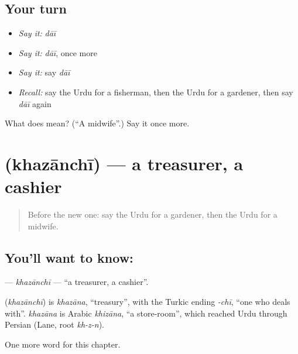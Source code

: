 \subsection*{Your turn}
\begin{itemize}
\raggedright
  \item \emph{Say it:} \emph{dāī}
  \item \emph{Say it:} \emph{dāī}, once more
  \item \emph{Say it:} say \emph{dāī}
  \item \emph{Recall:} say the Urdu for a fisherman, then the Urdu for a gardener, then say \emph{dāī} again
\end{itemize}

\begin{tcolorbox}[breakable,colback=teal!4,colframe=teal!35!black,title={Before you move on}]
What does  mean? (\textquotedblleft{}A midwife\textquotedblright{}.) Say it once more.
\end{tcolorbox}
\section[\texorpdfstring{\ur{خزانچی} (khazānchī)}{خزانچی (khazānchī)}]{ (khazānchī) — a treasurer, a cashier}

\label{lesson:UR-C179-khazanchi}



\begin{quote}
Before the new one: say the Urdu for a gardener, then the Urdu for a midwife.
\end{quote}

\subsection*{You'll want to know: }
\textbf{} — \emph{khazānchī} — \textquotedblleft{}a treasurer, a cashier\textquotedblright{}.

\begin{cousinweb}
\textbf{} (\emph{khazānchī}) is \emph{khazāna}, \textquotedblleft{}treasury\textquotedblright{}, with the Turkic ending \emph{-chī}, \textquotedblleft{}one who deals with\textquotedblright{}. \emph{khazāna} is Arabic \emph{khizāna}, \textquotedblleft{}a store-room\textquotedblright{}, which reached Urdu through Persian (Lane, root \emph{kh-z-n}).
\end{cousinweb}

\begin{grammarlens}[title={What you've built}]
One more word for this chapter.
\end{grammarlens}


